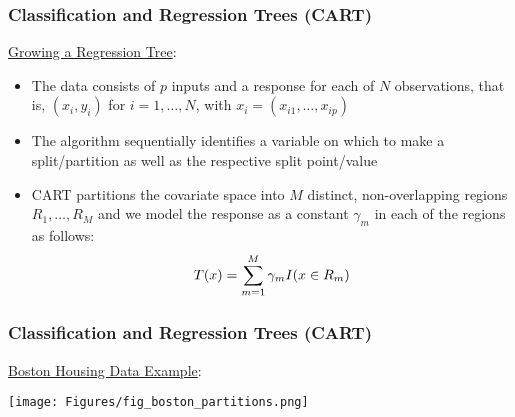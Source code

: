 \documentclass{beamer}
\begin{document}
\begin{frame}

    \frametitle{Classification and Regression Trees (CART)}
    
    \underline{Growing a Regression Tree}:
    \bigskip
    
        \begin{itemize}
            \small
            \item The data consists of $p$ inputs and a response for each of $N$
                  observations, that is, $(x_i,y_i)$ for $i = 1,\dots, N$, with
                  $x_i = (x_{i1}, \dots, x_{ip})$
            \medskip
            \item The algorithm sequentially identifies a variable on which to 
                  make a split/partition as well as the respective split 
                  point/value
            \medskip
            \item CART partitions the covariate space into $M$ distinct,
                  non-overlapping regions $R_1, \dots, R_M$ and we model
                  the response as a constant $\gamma_m$ in each of the regions
                  as follows:
        \begin{equation}
            \small
            T(x) = \sum_{m=1}^M \gamma_m I(x \in R_m)
        \end{equation}
        \end{itemize}

\end{frame}



\begin{frame}

    \frametitle{Classification and Regression Trees (CART)}
    
    \underline{Boston Housing Data Example}:
    
    \begin{center}
        \texttt{[image: Figures/fig\_boston\_partitions.png]}
    \end{center}
    
\end{frame}


\end{document}
